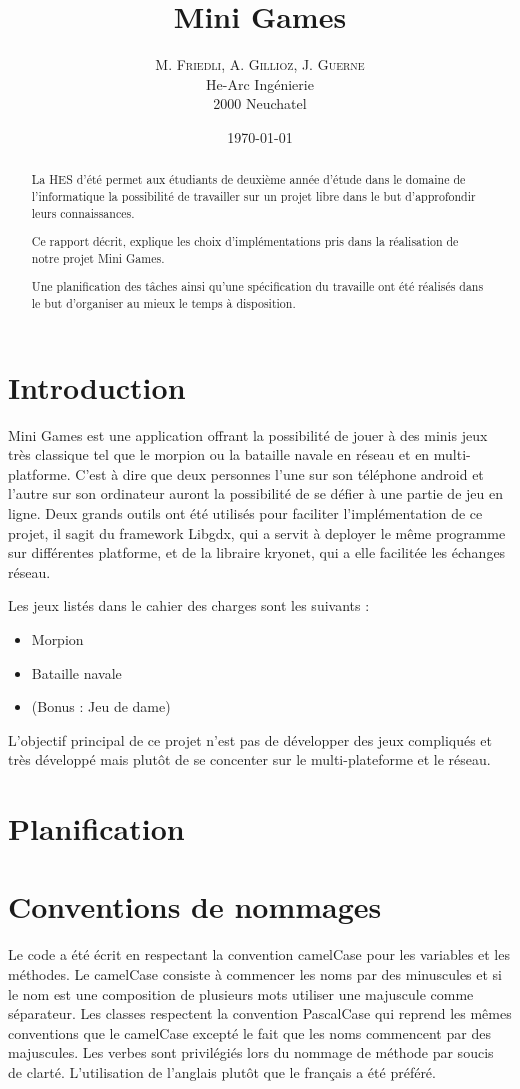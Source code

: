 \documentclass{report}
\title{Mini Games}
\author{M. \textsc{Friedli}, A. \textsc{Gillioz}, J. \textsc{Guerne}\\
He-Arc Ingénierie\\
2000 Neuchatel}
\date{\today{}}
\begin{document}
\maketitle{}

\begin{abstract}
La HES d'été permet aux étudiants de deuxième année d'étude dans le domaine de l'informatique
la possibilité de travailler sur un projet libre dans le but d'approfondir leurs connaissances.

Ce rapport décrit, explique les choix d'implémentations pris dans la réalisation de notre
projet Mini Games.

Une planification des tâches ainsi qu'une spécification du travaille ont été réalisés dans le but
d'organiser au mieux le temps à disposition.
\end{abstract}
\tableofcontents

\chapter{Introduction}
Mini Games est une application offrant la possibilité de jouer à des minis jeux très classique tel
que le morpion ou la bataille navale en réseau et en multi-platforme. C'est à dire que deux personnes
l'une sur son téléphone android et l'autre sur son ordinateur auront la possibilité de se défier à une partie de jeu en ligne.
Deux grands outils ont été utilisés pour faciliter l'implémentation de ce projet, il sagit du framework Libgdx, qui a servit à
deployer le même programme sur différentes platforme, et de la libraire kryonet, qui a elle facilitée les échanges réseau.

Les jeux listés dans le cahier des charges sont les suivants :
\begin{itemize}
	\item Morpion
	\item Bataille navale
	\item (Bonus : Jeu de dame)
\end{itemize}
L'objectif principal de ce projet n'est pas de développer des jeux compliqués et très
développé mais plutôt de se concenter sur le multi-plateforme et le réseau.

\chapter{Planification}

\chapter{Conventions de nommages}
Le code a été écrit en respectant la convention camelCase pour les variables et
les méthodes. Le camelCase consiste à commencer les noms par des minuscules et si
le nom est une composition de plusieurs mots utiliser une majuscule comme séparateur.
Les classes respectent la convention PascalCase qui reprend les mêmes conventions que
le camelCase excepté le fait que les noms commencent par des majuscules.
Les verbes sont privilégiés lors du nommage de méthode par soucis de clarté.
L’utilisation de l’anglais plutôt que le français a été préféré.
\end{document}
